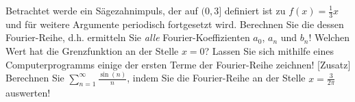 \item Betrachtet werde ein Sägezahnimpuls, der auf $(0, 3]$ definiert ist zu $f(x) = \frac{1}{3}x$ und für weitere Argumente periodisch fortgesetzt wird. Berechnen Sie die dessen Fourier-Reihe, d.h. ermitteln Sie \emph{alle} Fourier-Koeffizienten $a_0$, $a_n$ und $b_n$! Welchen Wert hat die Grenzfunktion an der Stelle $x=0$? Lassen Sie sich mithilfe eines Computerprogramms einige der ersten Terme der Fourier-Reihe zeichnen! [Zusatz] Berechnen Sie $\sum_{n=1}^\infty \frac{\sin(n)}{n}$, indem Sie die Fourier-Reihe an der Stelle $x=\frac{3}{2\pi}$ auswerten!